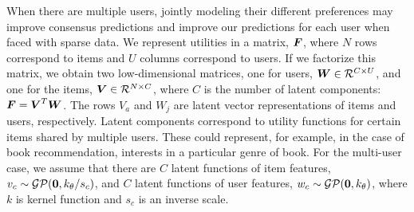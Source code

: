 
When there are multiple users, jointly modeling their different preferences may improve consensus predictions and
improve our predictions for each user when faced with sparse data.
We represent utilities in a matrix, $\boldsymbol{F}$,
where $N$ rows correspond to items and $U$ columns correspond to users. %
If we factorize this matrix, we obtain two low-dimensional matrices,
one for users, $\boldsymbol{W} \in \mathcal{R}^{C \times U}$, 
and one for the items, $\boldsymbol{V} \in \mathcal{R}^{N \times C}$,
where $C$ is the number of latent components:
$\boldsymbol{F} = \boldsymbol{V}^T \boldsymbol{W}$.
The rows $V_a$ and $W_j$ are latent vector representations of items and users, respectively.
Latent components correspond to utility functions for certain items shared by multiple users.
These could represent, for example, 
in the case of book recommendation, interests in a particular genre of book. 
For the multi-user case, we assume that there are $C$ latent functions of item features, $v_c\sim \mathcal{GP}(\boldsymbol 0, k_{\theta} /s_c)$, 
 and $C$ latent functions of user features, $w_c \sim \mathcal{GP}(\boldsymbol 0, k_{\theta})$,
 where $k$ is kernel function and $s_c$ is an inverse scale.

